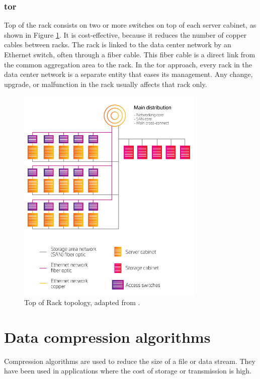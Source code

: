 \subsubsection{\ac{tor}} 

Top of the rack consists on two or more switches on top of each server cabinet, as shown in Figure \ref{figure:tor_topology}. It is cost-effective, because it reduces the number of copper cables between racks. The rack is linked to the data center network by an Ethernet switch, often through a fiber cable. This fiber cable is a direct link from the common aggregation area to the rack.
In the \ac{tor} approach, every rack in the data center network is a separate entity that eases its management. Any change, upgrade, or malfunction in the rack usually affects that rack only.

\begin{figure}[h]
    \centering
    \includegraphics[width=0.8\textwidth]{figs/tor_topology.png}
    \caption[Top of Rack topology.] {Top of Rack topology, adapted from \citet{commScope}.}
    \label{figure:tor_topology}
\end{figure}

\section{Data compression algorithms}

Compression algorithms are used to reduce the size of a file or data stream. They have been used in applications where the cost of storage or transmission is high.

